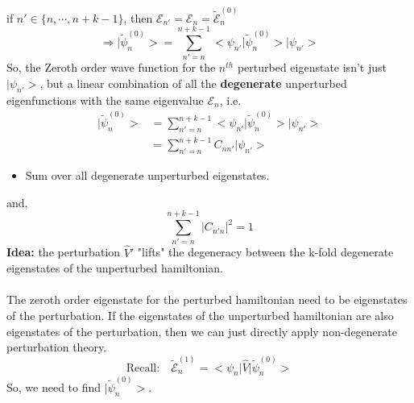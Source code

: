 \documentclass[12pt,fancychapters]{report}
\numberwithin{equation}{section}
\begin{document}
if $n' \in \{n, \cdots , n+k-1\}$, then $\mathcal{E}_{n'} = \mathcal{E}_n = \tilde{\mathcal{E}
}_n^{(0)}$
\begin{equation*}
	\Rightarrow \boxed{\big|\tilde{\psi}_n^{(0)}\big> = \sum_{n'=n}^{n+k-1}\big<\psi_{n'}\big|\tilde{
	\psi}_n^{(0)}\big>\big|\psi_{n'}\big>} 
\end{equation*}
So, the Zeroth order wave function for the $n^{th}$ perturbed eigenstate isn't just $\big|\psi_
{n'}\big>$, but a linear combination of all the \textbf{degenerate} unperturbed eigenfunctions 
with the same eigenvalue $\mathcal{E}_n$, i.e. 
\begin{align*}
	\big|\tilde{\psi}_n^{(0)}\big> &= \sum_{n'=n}^{n+k-1}
	\big<\psi_{n'}\big|\tilde{\psi}_n^{(0)}\big>\big|\psi_{n'}\big>\\
	&= \sum_{n'=n}^{n+k-1} C_{nn'}\big|\psi_{n'}\big> 
\end{align*}	
\begin{itemize}
	\item Sum over all degenerate unperturbed eigenstates. 
	\end{itemize}
and, 
\[\sum_{n'=n}^{n+k-1}\big|C_{n'n}\big|^2 = 1\]
\textbf{Idea:} the perturbation $\hat{V}'$ "lifts" the degeneracy between the k-fold degenerate
eigenstates of the unperturbed hamiltonian.\\
\\
The zeroth order eigenstate for the perturbed hamiltonian need to be eigenstates of the
perturbation. If the eigenstates of the unperturbed hamiltonian are also eigenstates of the 
perturbation, then we can just directly apply non-degenerate perturbation theory. 
\[\text{Recall:}\quad \tilde{\mathcal{E}}_n^{(1)} = \big<\psi_n \big|\hat{V}\big|\tilde{\psi}
_n^{(0)}\big>\]
So, we need to find $\big|\tilde{\psi}_n^{(0)}\big>$.
\newpage

\end{document}
